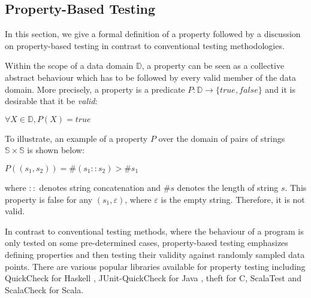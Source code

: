 
\newcommand{\avector}[2]{(#1_1,#1_2,\ldots,#1_{#2})}
\newcommand{\aDEFvector}[2][a]{(#1_1,#1_2,\ldots,#1_{#2})}

\subsection{Property-Based Testing}
In this section, we give a formal definition of a property followed by a discussion on property-based testing in contrast to conventional testing methodologies.

Within the scope of a data domain $\mathbb{D}$, a property can be seen as a collective abstract behaviour which has to be followed by every valid member of the data domain. More precisely, a property is a predicate $P: \mathbb{D} \rightarrow \{true, false\}$ and it is desirable that it be \emph{valid}: 
\begin{center}
$\forall X \in \mathbb{D}, P(X) = true$
\end{center}
To illustrate, an example of a property $P$ over the domain of pairs of strings $\mathbb{S} \times \mathbb{S}$ is shown below:
\begin{center}
$P((s_1, s_2)) = \#(s_1::s_2) > \#s_1$
\end{center}
where $::$ denotes string concatenation and $\#s$ denotes the length of string $s$. This property is false for any $(s_1, \varepsilon)$, where $\varepsilon$ is the empty string. Therefore, it is not valid.

In contrast to conventional testing methods, where the behaviour of a program is only tested on some pre-determined cases, property-based testing \cite{ron2001property} emphasizes defining properties and then testing their validity against randomly sampled data points. There are various popular libraries available for property testing including QuickCheck for Haskell \cite{claessen2011quickcheck}, JUnit-QuickCheck for Java \cite{jung2015quickcheck}, theft for C, ScalaTest \cite{venners2009scalatest} and ScalaCheck \cite{nilsson2014scalacheck} for Scala.

